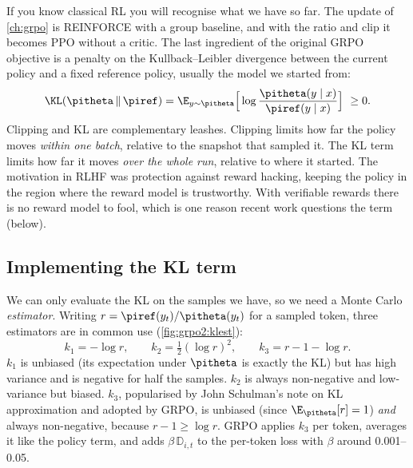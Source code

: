 If you know classical RL you will recognise what we have so far. The update of \cref{ch:grpo}
is REINFORCE with a group baseline, and with the ratio and clip it becomes PPO without a
critic. The last ingredient of the original GRPO objective is a penalty on the
Kullback--Leibler divergence between the current policy and a fixed reference policy, usually
the model we started from:
\begin{equation}
\KL(\pitheta\,\|\,\piref)=\E_{y\sim\pitheta}\Big[\log\frac{\pitheta(y\mid x)}{\piref(y\mid x)}\Big]\ \ge 0.
\end{equation}
Clipping and KL are complementary leashes. Clipping limits how far the policy moves
\emph{within one batch}, relative to the snapshot that sampled it. The KL term limits how far it
moves \emph{over the whole run}, relative to where it started. The motivation in RLHF was
protection against reward hacking, keeping the policy in the region where the reward model is
trustworthy. With verifiable rewards there is no reward model to fool, which is one reason
recent work questions the term (below).

\subsection{Implementing the KL term}\label{sec:grpo2:klimpl}

We can only evaluate the KL on the samples we have, so we need a Monte Carlo
\emph{estimator}. Writing $r=\piref(y_t)/\pitheta(y_t)$ for a sampled token, three estimators
are in common use (\cref{fig:grpo2:klest}):
\begin{equation}
k_1=-\log r,\qquad k_2=\tfrac12(\log r)^2,\qquad k_3=r-1-\log r .
\end{equation}
$k_1$ is unbiased (its expectation under $\pitheta$ is exactly the KL) but has high variance
and is negative for half the samples. $k_2$ is always non-negative and low-variance but
biased. $k_3$, popularised by John Schulman's note on KL approximation and adopted by GRPO,
is unbiased (since $\E_{\pitheta}[r]=1$) \emph{and} always non-negative, because
$r-1\ge\log r$. GRPO applies $k_3$ per token, averages it like the policy term, and adds
$\beta\,\mathbb{D}_{i,t}$ to the per-token loss with $\beta$ around 0.001--0.05.

